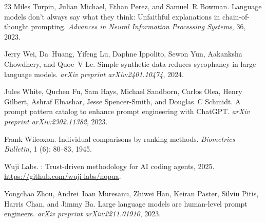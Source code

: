 \documentclass[11pt]{article}
\begin{document}
\begin{thebibliography}{23}
Miles Turpin, Julian Michael, Ethan Perez, and Samuel~R Bowman.
\newblock Language models don't always say what they think: Unfaithful explanations in chain-of-thought prompting.
\newblock \emph{Advances in Neural Information Processing Systems}, 36, 2023.

Jerry Wei, Da~Huang, Yifeng Lu, Daphne Ippolito, Sewon Yun, Aakanksha Chowdhery, and Quoc~V Le.
\newblock Simple synthetic data reduces sycophancy in large language models.
\newblock \emph{arXiv preprint arXiv:2401.10474}, 2024.

Jules White, Quchen Fu, Sam Hays, Michael Sandborn, Carlos Olea, Henry Gilbert, Ashraf Elnashar, Jesse Spencer-Smith, and Douglas~C Schmidt.
\newblock A prompt pattern catalog to enhance prompt engineering with {ChatGPT}.
\newblock \emph{arXiv preprint arXiv:2302.11382}, 2023.

Frank Wilcoxon.
\newblock Individual comparisons by ranking methods.
\newblock \emph{Biometrics Bulletin}, 1 (6): 80--83, 1945.

{Wuji Labs}.
: Trust-driven methodology for {AI} coding agents, 2025.
\newblock \url{https://github.com/wuji-labs/nopua}.

Yongchao Zhou, Andrei~Ioan Muresanu, Zhiwei Han, Keiran Paster, Silviu Pitis, Harris Chan, and Jimmy Ba.
\newblock Large language models are human-level prompt engineers.
\newblock \emph{arXiv preprint arXiv:2211.01910}, 2023.

\end{thebibliography}
\end{document}
